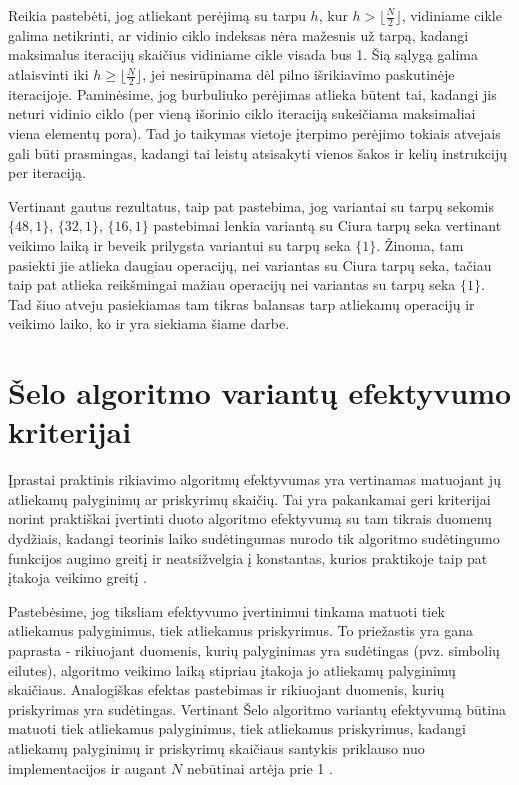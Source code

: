 \documentclass{VUMIFInfBakalaurinis}
\begin{document}
Reikia pastebėti, jog atliekant perėjimą su tarpu $h$, kur $h > \lfloor\frac{N}{2}\rfloor$, vidiniame cikle galima netikrinti,
ar vidinio ciklo indeksas nėra mažesnis už tarpą, kadangi maksimalus iteracijų skaičius vidiniame cikle visada bus 1.
Šią sąlygą galima atlaisvinti iki $h \geq \lfloor\frac{N}{2}\rfloor$, jei nesirūpinama dėl pilno išrikiavimo paskutinėje iteracijoje. 
Paminėsime, jog burbuliuko perėjimas atlieka būtent tai, kadangi jis neturi vidinio ciklo (per vieną išorinio ciklo iteraciją sukeičiama maksimaliai viena elementų pora).
Tad jo taikymas vietoje įterpimo perėjimo tokiais atvejais gali būti prasmingas, kadangi tai leistų atsisakyti vienos šakos ir kelių instrukcijų per iteraciją.  

Vertinant gautus rezultatus, taip pat pastebima, jog variantai su tarpų sekomis $\{48, 1\}$, $\{32, 1\}$, $\{16, 1\}$ pastebimai lenkia variantą
su Ciura tarpų seka vertinant veikimo laiką ir beveik prilygsta variantui su tarpų seka $\{1\}$.
Žinoma, tam pasiekti jie atlieka daugiau operacijų, nei variantas su Ciura tarpų seka, tačiau taip pat atlieka reikšmingai mažiau operacijų nei variantas su tarpų seka $\{1\}$.
Tad šiuo atveju pasiekiamas tam tikras balansas tarp atliekamų operacijų ir veikimo laiko, ko ir yra siekiama šiame darbe.



\section{Šelo algoritmo variantų efektyvumo kriterijai}

Įprastai praktinis rikiavimo algoritmų efektyvumas yra vertinamas matuojant jų atliekamų palyginimų ar priskyrimų skaičių.
Tai yra pakankamai geri kriterijai norint praktiškai įvertinti duoto algoritmo efektyvumą su tam tikrais duomenų dydžiais,
kadangi teorinis laiko sudėtingumas nurodo tik algoritmo sudėtingumo funkcijos augimo greitį ir
neatsižvelgia į konstantas, kurios praktikoje taip pat įtakoja veikimo greitį \cite{biggar2005sorting}.

Pastebėsime, jog tiksliam efektyvumo įvertinimui tinkama matuoti tiek atliekamus palyginimus, tiek atliekamus priskyrimus.
To priežastis yra gana paprasta - rikiuojant duomenis, kurių palyginimas yra sudėtingas (pvz. simbolių eilutes),
algoritmo veikimo laiką stipriau įtakoja jo atliekamų palyginimų skaičiaus.
Analogiškas efektas pastebimas ir rikiuojant duomenis, kurių priskyrimas yra sudėtingas.
Vertinant Šelo algoritmo variantų efektyvumą būtina matuoti tiek atliekamus palyginimus, tiek atliekamus priskyrimus, kadangi
atliekamų palyginimų ir priskyrimų skaičiaus santykis priklauso nuo implementacijos ir augant $N$ nebūtinai artėja prie 1 \cite{Radavičius_Baranauskas_2013}.
\end{document}
